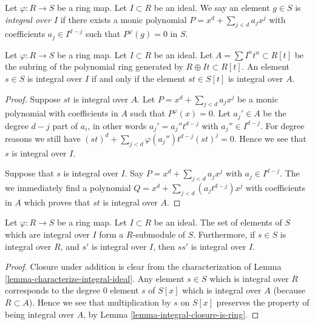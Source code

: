 \begin{definition}
\label{definition-integral-over-ideal}
Let $\varphi : R\to S$ be a ring map.
Let $I \subset R$ be an ideal.
We say an element $g \in S$ is
{\it integral over $I$} if
there exists a monic
polynomial $P = x^d + \sum_{j < d} a_j x^j$
with coefficients $a_j \in I^{d-j}$ such
that $P^\varphi(g) = 0$ in $S$.
\end{definition}

\begin{lemma}
\label{lemma-characterize-integral-ideal}
Let $\varphi : R \to S$ be a ring map.
Let $I \subset R$ be an ideal.
Let $A = \sum I^nt^n \subset R[t]$ be the
subring of the polynomial ring
generated by $R \oplus It \subset R[t]$.
An element $s \in S$ is integral over $I$ if
and only if the element $st \in S[t]$
is integral over $A$.
\end{lemma}

\begin{proof}
Suppose $st$ is integral over $A$.
Let $P = x^d + \sum_{j < d} a_j x^j$
be a monic polynomial with coefficients in $A$
such that $P^\varphi(x) = 0$. Let $a_j' \in A$
be the degree $d-j$ part of $a_i$, in other
words $a_j' = a_j'' t^{d-j}$ with $a_j'' \in I^{d-j}$.
For degree reasons we still have
$(st)^d + \sum_{j < d} \varphi(a_j'') t^{d-j} (st)^j = 0$.
Hence we see that $s$ is integral over $I$.

\medskip\noindent
Suppose that $s$ is integral over $I$.
Say $P = x^d + \sum_{j < d} a_j x^j$
with $a_j \in I^{d-j}$. The we immediately find a
polynomial $Q = x^d + \sum_{j < d} (a_j t^{d-j}) x^j$
with coefficients in $A$ which proves that
$st$ is integral over $A$.
\end{proof}

\begin{lemma}
\label{lemma-integral-over-ideal-is-submodule}
Let $\varphi : R \to S$ be a ring map.
Let $I \subset R$ be an ideal.
The set of elements of $S$ which are integral
over $I$ form a $R$-submodule of $S$.
Furthermore, if $s \in S$ is integral over
$R$, and $s'$ is integral over $I$, then
$ss'$ is integral over $I$.
\end{lemma}

\begin{proof}
Closure under addition is clear from the
characterization of Lemma \ref{lemma-characterize-integral-ideal}.
Any element $s \in S$ which is integral over
$R$ corresponds to the degree $0$ element $s$ of $S[x]$
which is integral over $A$ (because $R \subset A$).
Hence we see that multiplication by $s$ on $S[x]$
preserves the property of being integral over $A$,
by Lemma \ref{lemma-integral-closure-is-ring}.
\end{proof}


